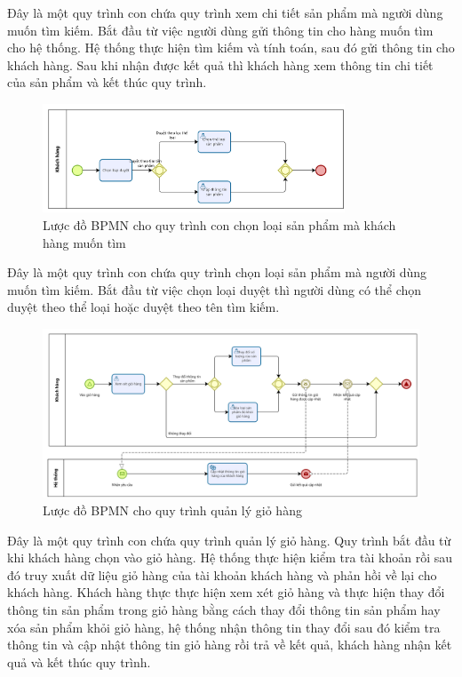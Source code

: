 Đây là một quy trình con chứa quy trình xem chi tiết sản phẩm mà người dùng muốn tìm kiếm. Bắt đầu từ việc người dùng gửi thông tin cho hàng muốn tìm cho hệ thống. Hệ thống thực hiện tìm kiếm và tính toán, sau đó gửi thông tin cho khách hàng. Sau khi nhận được kết quả thì khách hàng xem thông tin chi tiết của sản phẩm và kết thúc quy trình.


\newpage
\begin{figure}[!htp]
	\centering
	\includegraphics[width=9cm]{img/BPMN/customer_buy/customer_select_type.png}
	\newline
	\caption{Lược đồ BPMN cho quy trình con chọn loại sản phẩm mà khách hàng muốn tìm}
\end{figure}

Đây là một quy trình con chứa quy trình chọn loại sản phẩm mà người dùng muốn tìm kiếm. Bắt đầu từ việc chọn loại duyệt thì người dùng có thể chọn duyệt theo thể loại hoặc duyệt theo tên tìm kiếm.

\begin{figure}[!htp]
	\centering
	\includegraphics[width=14cm]{img/BPMN/customer_buy/customer_cart.png}
	\newline
	\caption{Lược đồ BPMN cho quy trình quản lý giỏ hàng}
\end{figure}

Đây là một quy trình con chứa quy trình quản lý giỏ hàng. Quy trình bắt đầu từ khi khách hàng chọn vào giỏ hàng. Hệ thống thực hiện kiểm tra tài khoản rồi sau đó truy xuất dữ liệu giỏ hàng của tài khoản khách hàng và phản hồi về lại cho khách hàng. Khách hàng thực thực hiện xem xét giỏ hàng và thực hiện thay đổi thông tin sản phẩm trong giỏ hàng bằng cách thay đổi thông tin sản phẩm hay xóa sản phẩm khỏi giỏ hàng, hệ thống nhận thông tin thay đổi sau đó kiểm tra thông tin và cập nhật thông tin giỏ hàng rồi trả về kết quả, khách hàng nhận kết quả và kết thúc quy trình.


